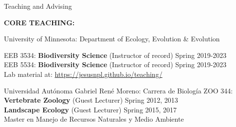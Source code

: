\documentclass{resume} %
\begin{document}
\begin{rSection}{Teaching and Advising}

\textbf{CORE TEACHING:}

\normalfont 

\begin{reSubsection}{University of Minnesota: }{Department of Ecology, Evolution \& Evolution }{}{
EEB 3534: \textbf{Biodiversity Science} (Instructor of record) \hfill Spring 2019-2023 \\ 
EEB 5534: \textbf{Biodiversity Science} (Instructor of record) \hfill Spring 2019-2023 \\ 
{Lab material at:
\url{https://jesusnpl.github.io/teaching/}} \smallskip



 
}

\end{reSubsection}

\begin{reSubsection}{Universidad Autónoma Gabriel René Moreno: }{Carrera de Biología }{}{
ZOO 344: \textbf{Vertebrate Zoology} (Guest Lecturer) \hfill Spring 2012, 2013 \\ \textbf{Landscape Ecology} (Guest Lecturer) \hfill Spring 2015, 2017 \\
{Master en Manejo de Recursos Naturales y Medio Ambiente} \smallskip 
} 
\end{reSubsection}


\end{rSection}
\end{document}
